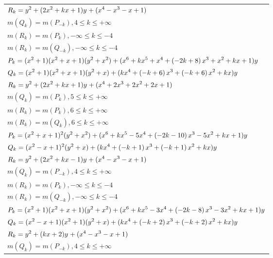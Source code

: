 \documentclass{amsart}
\begin{document}
\begin{longtable}{|l|}
\(\displaystyle R_k=y^{2}+(2\*x^2
 + k\*x
 + 1)y^{}+(x^4
 - x^3
 - x
 + 1)\)\\
\(\displaystyle m(Q_k) = m(P_{-k}),4 \leqslant k \leqslant +\infty\)\\
\(\displaystyle m(R_k) = m(P_{k}),-\infty \leqslant k \leqslant -4\)\\
\(\displaystyle m(R_k) = m(Q_{-k}),-\infty \leqslant k \leqslant -4\)\\
\hline
\(\displaystyle P_k=(x^2
 + 1)(x^2
 + x
 + 1)(y^2+x^2)+(x^6
 + k\*x^5
 + x^4
 + \left(-2\*k
 + 8\right) \*x^3
 + x^2
 + k\*x
 + 1)y\)\\
\(\displaystyle Q_k=(x^2
 + 1)(x^2
 + x
 + 1)(y^2+x)+(k\*x^4
 + \left(-k
 + 6\right) \*x^3
 + \left(-k
 + 6\right) \*x^2
 + k\*x)y\)\\
\(\displaystyle R_k=y^{2}+(2\*x^2
 + k\*x
 + 1)y^{}+(x^4
 + 2\*x^3
 + 2\*x^2
 + 2\*x
 + 1)\)\\
\(\displaystyle m(Q_k) = m(P_{k}),5 \leqslant k \leqslant +\infty\)\\
\(\displaystyle m(R_k) = m(P_{k}),6 \leqslant k \leqslant +\infty\)\\
\(\displaystyle m(R_k) = m(Q_{k}),6 \leqslant k \leqslant +\infty\)\\
\hline
\(\displaystyle P_k=(x^2
 + x
 + 1)^{2}(y^2+x^2)+(x^6
 + k\*x^5
 - 5\*x^4
 + \left(-2\*k
 - 10\right) \*x^3
 - 5\*x^2
 + k\*x
 + 1)y\)\\
\(\displaystyle Q_k=(x^2
 - x
 + 1)^{2}(y^2+x)+(k\*x^4
 + \left(-k
 + 1\right) \*x^3
 + \left(-k
 + 1\right) \*x^2
 + k\*x)y\)\\
\(\displaystyle R_k=y^{2}+(2\*x^2
 + k\*x
 - 1)y^{}+(x^4
 - x^3
 - x
 + 1)\)\\
\(\displaystyle m(Q_k) = m(P_{-k}),4 \leqslant k \leqslant +\infty\)\\
\(\displaystyle m(R_k) = m(P_{k}),-\infty \leqslant k \leqslant -4\)\\
\(\displaystyle m(R_k) = m(Q_{-k}),-\infty \leqslant k \leqslant -4\)\\
\hline
\(\displaystyle P_k=(x^2
 + 1)(x^2
 + x
 + 1)(y^2+x^2)+(x^6
 + k\*x^5
 - 3\*x^4
 + \left(-2\*k
 - 8\right) \*x^3
 - 3\*x^2
 + k\*x
 + 1)y\)\\
\(\displaystyle Q_k=(x^2
 - x
 + 1)(x^2
 + 1)(y^2+x)+(k\*x^4
 + \left(-k
 + 2\right) \*x^3
 + \left(-k
 + 2\right) \*x^2
 + k\*x)y\)\\
\(\displaystyle R_k=y^{2}+(k\*x
 + 2)y^{}+(x^4
 - x^3
 - x
 + 1)\)\\
\(\displaystyle m(Q_k) = m(P_{-k}),4 \leqslant k \leqslant +\infty\)\\

\end{longtable}
\end{document}
